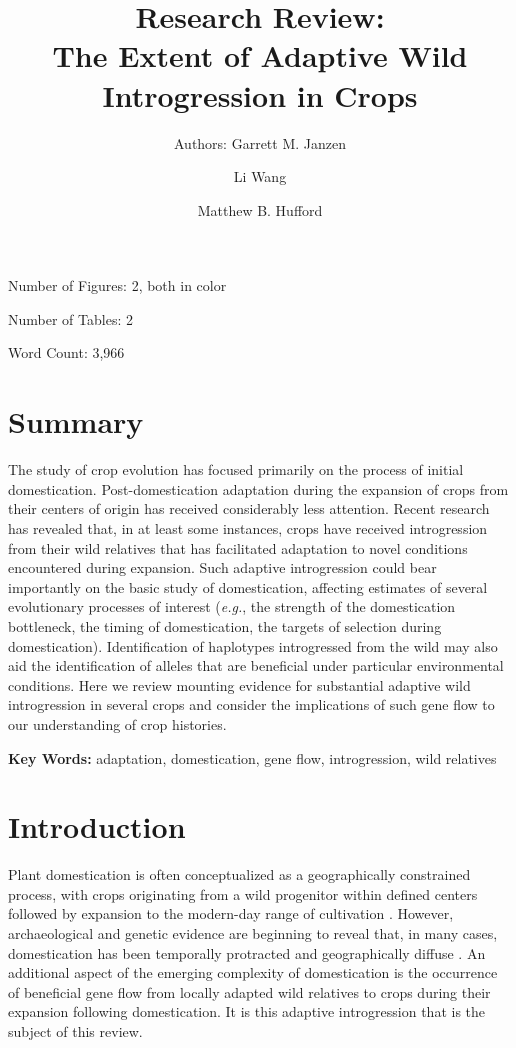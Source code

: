 \documentclass[11pt]{article}
\title{Research Review: \\The Extent of Adaptive Wild Introgression in Crops}
\author[1]{Authors: Garrett M. Janzen}%
\author[1]{Li Wang}
\author[1,*]{Matthew B. Hufford}
\affil[1]{Department of Ecology, Evolution, and Organismal Biology, Iowa State University, Ames, Iowa, USA}
\affil[*]{Correspondence: email: mhufford@iastate.edu, telephone: 1-515-294-8511}
\date{}
\begin{document}
\maketitle

Number of Figures: 2, both in color

Number of Tables: 2

Word Count: 3,966

\clearpage

\section*{Summary}
The study of crop evolution has focused primarily on the process of initial domestication.
Post-domestication adaptation during the expansion of crops from their centers of origin has received considerably less attention.
Recent research has revealed that, in at least some instances, crops have received introgression from their wild relatives that has facilitated adaptation to novel conditions encountered during expansion.
Such adaptive introgression could bear importantly on the basic study of domestication, affecting estimates of several evolutionary processes of interest (\emph{e.g.}, the strength of the domestication bottleneck, the timing of domestication, the targets of selection during domestication).
Identification of haplotypes introgressed from the wild may also aid the identification of alleles that are beneficial under particular environmental conditions.
Here we review mounting evidence for substantial adaptive wild introgression in several crops and consider the implications of such gene flow to our understanding of crop histories.


\textbf{Key Words:} adaptation, domestication, gene flow, introgression, wild relatives

\section*{Introduction}

Plant domestication is often conceptualized as a geographically constrained process, with crops originating from a wild progenitor within defined centers followed by expansion to the modern-day range of cultivation \citep{Harlan1992}.
However, archaeological and genetic evidence are beginning to reveal that, in many cases, domestication has been temporally protracted and geographically diffuse \citep{Meyer2016, Wang2017, Fuller2014}.
An additional aspect of the emerging complexity of domestication is the occurrence of beneficial gene flow from locally adapted wild relatives to crops during their expansion following domestication.
It is this adaptive introgression that is the subject of this review.
\end{document}
